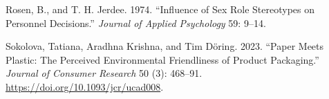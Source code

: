 \documentclass[
  11pt,
  letterpaper,
]{scrbook}
\newlength{\cslhangindent}
\newenvironment{CSLReferences}[2] %
 {\begin{list}{}{%
  \setlength{\itemindent}{0pt}
  \setlength{\leftmargin}{0pt}
  \setlength{\parsep}{0pt}
  \ifodd #1
   \setlength{\leftmargin}{\cslhangindent}
   \setlength{\itemindent}{-1\cslhangindent}
  \fi
  \setlength{\itemsep}{#2\baselineskip}}}
 {\end{list}}
\theoremstyle{plain}
\theoremstyle{definition}
\theoremstyle{definition}
\theoremstyle{remark}
\begin{document}
\begin{CSLReferences}{1}{0}
Rosen, B., and T. H. Jerdee. 1974. {``Influence of Sex Role Stereotypes
on Personnel Decisions.''} \emph{Journal of Applied Psychology} 59:
9--14.

Sokolova, Tatiana, Aradhna Krishna, and Tim Döring. 2023. {``Paper Meets
Plastic: The Perceived Environmental Friendliness of Product
Packaging.''} \emph{Journal of Consumer Research} 50 (3): 468--91.
\url{https://doi.org/10.1093/jcr/ucad008}.

\end{CSLReferences}


\backmatter
\end{document}

